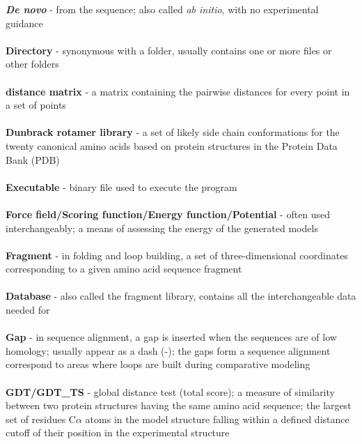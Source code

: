 \textbf{\textit{De novo}} - from the sequence; also called \textit{ab initio}, with no experimental guidance \\ \\

\textbf{Directory} - synonymous with a folder, usually contains one or more files or other folders \\ \\

\textbf{distance matrix} - a matrix containing the pairwise distances for every point in a set of points \\ \\

\textbf{Dunbrack rotamer library} - a set of likely side chain conformations for the twenty canonical amino acids based on protein structures in the Protein Data Bank (PDB) \\ \\

\textbf{Executable} - binary file used to execute the program \\ \\

\textbf{Force field/Scoring function/Energy function/Potential} - often used interchangeably; a means of assessing the energy of the generated models \\ \\

\textbf{Fragment} - in \rosetta folding and loop building, a set of three-dimensional coordinates corresponding to a given amino acid sequence fragment \\ \\

\textbf{Database} - also called the fragment library, contains all the interchangeable data needed for \rosetta \\ \\

\textbf{Gap} - in sequence alignment, a gap is inserted when the sequences are of low homology; usually appear as a dash (-); the gaps form a sequence alignment correspond to areas where loops are
built during comparative modeling \\ \\

\textbf{GDT/GDT\_TS} - global distance test (total score); a measure of similarity between two protein structures having the same amino acid sequence; the largest set of residues C$\alpha$ atoms in the model structure falling within a defined distance cutoff of their position in the experimental structure \\ \\

